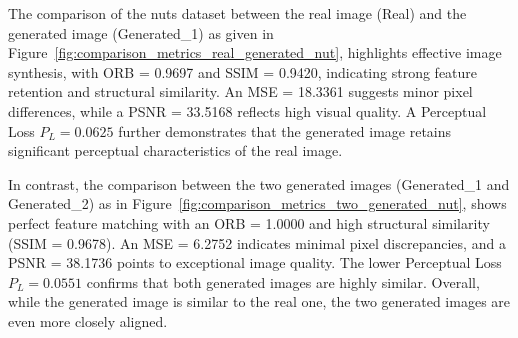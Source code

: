 \documentclass[12pt,DIV14,BCOR12mm,a4paper,footinclude=false,headinclude,parskip=half-,twoside,openright,cleardoublepage=empty,toc=index,bibliography=totoc,listof=totoc]{scrreprt}
\numberwithin{equation}{chapter}
\begin{document}
The comparison of the nuts dataset between the real image (Real) and the generated image (Generated\_1) as given in Figure~\ref{fig:comparison_metrics_real_generated_nut}, highlights effective image synthesis, with ORB = 0.9697 and SSIM = 0.9420, indicating strong feature retention and structural similarity. An MSE = 18.3361 suggests minor pixel differences, while a PSNR = 33.5168 reflects high visual quality. A Perceptual Loss \( P_L = 0.0625 \) further demonstrates that the generated image retains significant perceptual characteristics of the real image.

In contrast, the comparison between the two generated images (Generated\_1 and Generated\_2) as in Figure~\ref{fig:comparison_metrics_two_generated_nut}, shows perfect feature matching with an ORB = 1.0000 and high structural similarity (SSIM = 0.9678). An MSE = 6.2752 indicates minimal pixel discrepancies, and a PSNR = 38.1736 points to exceptional image quality. The lower Perceptual Loss \( P_L = 0.0551 \) confirms that both generated images are highly similar. Overall, while the generated image is similar to the real one, the two generated images are even more closely aligned.
\end{document}
